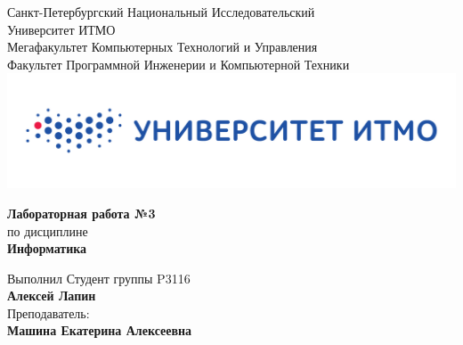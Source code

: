 \documentclass[12pt,onecolumn]{article}
\begin{document}
\setcounter{tocdepth}{4}
\begin{center}
    Санкт-Петербургский Национальный Исследовательский\\ 
    Университет ИТМО\\
    Мегафакультет Компьютерных Технологий и Управления\\
    Факультет Программной Инженерии и Компьютерной Техники \\
    \includegraphics[scale=0.3]{images/itm.jpg} %
\end{center}
\vspace{1cm}


\begin{center}
    \textbf{Лабораторная работа №3}\\
    по дисциплине\\
    \textbf{Информатика}
\end{center}

\vspace{2cm}

\begin{flushright}
  Выполнил Студент  группы P3116\\
  \textbf{Алексей Лапин}\\
  Преподаватель: \\
  \textbf{Машина Екатерина Алексеевна }\\
\end{flushright}
\end{document}
